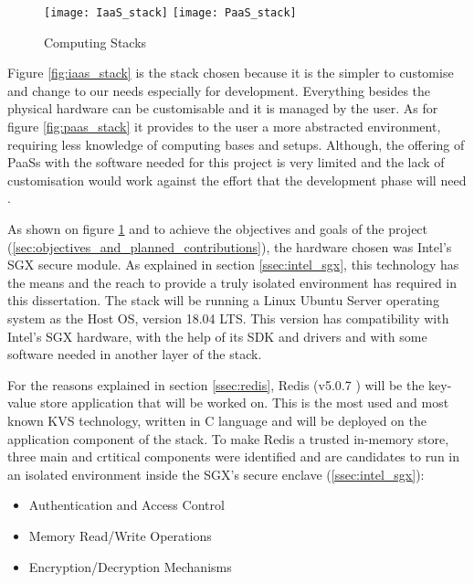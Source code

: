\begin{figure}[htbp]
  \centering
    {\texttt{[image: IaaS\_stack]}}%
    \hspace{5em}
    {\texttt{[image: PaaS\_stack]}}%
  \caption{Computing Stacks}
  \label{fig:computing_stacks}
\end{figure}

Figure \ref{fig:iaas_stack} is the stack chosen because it is the simpler to customise and change to our needs especially for development. Everything besides the physical hardware can be customisable and it is managed by the user. As for figure \ref{fig:paas_stack} it provides to the user a more abstracted environment, requiring less knowledge of computing bases and setups. Although, the offering of \glspl{PaaS} with the software needed for this project is very limited and the lack of customisation would work against the effort that the development phase will need \cite{computing_stacks:1}.

As shown on figure \ref{fig:computing_stacks} and to achieve the objectives and goals of the project (\ref{sec:objectives_and_planned_contributions}), the hardware chosen was Intel's \gls{SGX} secure module. As explained in section \ref{ssec:intel_sgx}, this technology has the means and the reach to provide a truly isolated environment has required in this dissertation. The stack will be running a Linux Ubuntu Server \cite{ubuntu_server:1} operating system as the Host \gls{OS}, version 18.04 LTS. This version has compatibility with Intel's \gls{SGX} hardware, with the help of its \gls{SDK} and drivers \cite{sgx_sdk:1, sgx_drivers:1} and with some software needed in another layer of the stack.

For the reasons explained in section \ref{ssec:redis}, Redis (v5.0.7 \cite{redis:1}) will be the key-value store application that will be worked on. This is the most used and most known \gls{KVS} technology, written in C language and will be deployed on the application component of the stack. To make Redis a trusted in-memory store, three main and crtitical components were identified and are candidates to run in an isolated environment inside the \gls{SGX}'s secure enclave (\ref{ssec:intel_sgx}):

\begin{itemize}
	\item Authentication and Access Control
	\item Memory Read/Write Operations
	\item Encryption/Decryption Mechanisms
\end{itemize}

